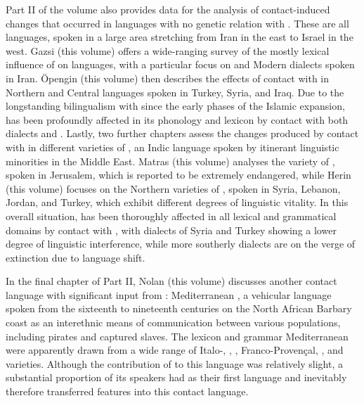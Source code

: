 \documentclass[output=paper]{langsci/langscibook}
\begin{document}
Part II of the volume also provides data for the analysis of contact-induced changes that occurred in languages with no genetic relation with . These are all  languages, spoken in a large area stretching from Iran in the east to Israel in the west. Gazsi (this volume) offers a wide-ranging survey of the mostly lexical influence of  on  languages, with a particular focus on  and Modern  dialects spoken in Iran. Öpengin (this volume) then describes the effects of contact with  in Northern and Central  languages spoken in Turkey, Syria, and Iraq. Due to the longstanding {bilingualism} with  since the early phases of the Islamic expansion,  has been profoundly affected in its phonology and lexicon by contact with both  dialects and  . Lastly, two further chapters assess the changes produced by contact with  in different varieties of , an Indic language spoken by itinerant linguistic minorities in the Middle East. Matras (this volume) analyses the  variety of , spoken in Jerusalem, which is reported to be extremely {endangered}, while Herin (this volume) focuses on the Northern varieties of , spoken in Syria, Lebanon, Jordan, and Turkey, which exhibit different degrees of linguistic vitality. In this overall situation,  has been thoroughly affected in all lexical and grammatical domains by contact with , with dialects of Syria and Turkey showing a lower degree of linguistic interference, while more southerly dialects are on the verge of extinction due to {language shift}.


In the final chapter of Part II, Nolan (this volume) discusses another contact language with significant input from : Mediterranean , a vehicular language spoken from the sixteenth to nineteenth centuries on the North African Barbary coast as an interethnic means of communication between various populations, including pirates and captured slaves. The lexicon and grammar Mediterranean  were apparently drawn from a wide range of Italo-, , , Franco-Provençal, ,  and  varieties. Although the contribution of  to this language was relatively slight, a substantial proportion of its speakers had  as their first language and inevitably therefore transferred  features into this contact language.
\end{document}

